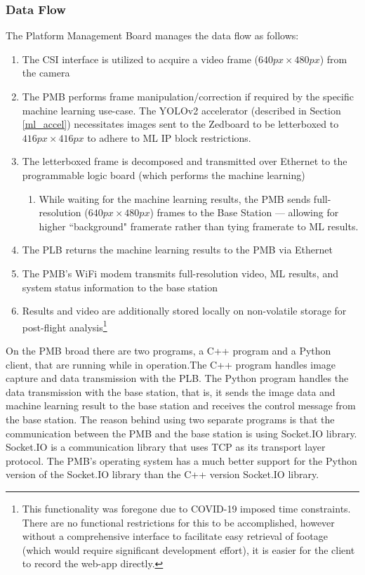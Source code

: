 \subsubsection{Data Flow}
\label{pmb_dataflow}
The Platform Management Board manages the data flow as follows:
\begin{enumerate}
\item The CSI interface is utilized to acquire a video frame ($640px \times 480px$) from the camera
\item The PMB performs frame manipulation/correction if required by the specific machine learning use-case. The YOLOv2 accelerator (described in Section \ref{ml_accel}) necessitates images sent to the Zedboard to be letterboxed to $416px \times 416px$ to adhere to ML IP block restrictions.
\item The letterboxed frame is decomposed and transmitted over Ethernet to the programmable logic board (which performs the machine learning)
\begin{enumerate}
\item While waiting for the machine learning results, the PMB sends full-resolution ($640px \times 480px$) frames to the Base Station --- allowing for higher ``background" framerate rather than tying framerate to ML results.
\end{enumerate}
\item The PLB returns the machine learning results to the PMB via Ethernet
\item The PMB's WiFi modem transmits full-resolution video, ML results, and system status information to the base station
\item Results and video are additionally stored locally on non-volatile storage for post-flight analysis\footnote{This functionality was foregone due to COVID-19 imposed time constraints. There are no functional restrictions for this to be accomplished, however without a comprehensive interface to facilitate easy retrieval of footage (which would require significant development effort), it is easier for the client to record the web-app directly.}
\end{enumerate}

On the PMB broad there are two programs, a C++ program and a Python client, that are running while in operation.The C++ program handles image capture and data transmission with the PLB. The Python program handles the data transmission with the base station, that is, it sends the image data and machine learning result to the base station and receives the control message from the base station. The reason behind using two separate programs is that the communication between the PMB and the base station is using Socket.IO library. Socket.IO is a communication library that uses TCP as its transport layer protocol. The PMB's operating system has a much better support for the Python version of the Socket.IO library than the C++ version Socket.IO library.

